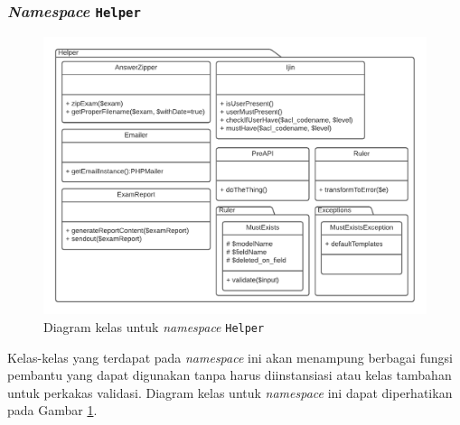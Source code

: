 \subsubsection{\textit{Namespace} \texttt{Helper}}
    \begin{figure}
        \centering
        \includegraphics[width=0.75\paperwidth]{Gambar/classmap-be/Classmap - app-helper.pdf}
        \caption{Diagram kelas untuk \textit{namespace} \texttt{Helper}}
        \label{fig:classmap_app-helper}
    \end{figure}
    Kelas-kelas yang terdapat pada \textit{namespace} ini akan menampung
    berbagai fungsi pembantu yang dapat digunakan tanpa harus diinstansiasi atau
    kelas tambahan untuk perkakas validasi. Diagram kelas untuk
    \textit{namespace} ini dapat diperhatikan pada Gambar
    \ref{fig:classmap_app-helper}.
    
